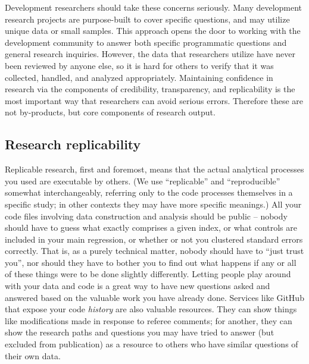 Development researchers should take these concerns seriously.
Many development research projects are purpose-built to cover specific questions,
and may utilize unique data or small samples.
This approach opens the door to working with the development community
to answer both specific programmatic questions and general research inquiries.
However, the data that researchers utilize have never been reviewed by anyone else,
so it is hard for others to verify that it was collected, handled, and analyzed appropriately.
Maintaining confidence in research via the components of credibility, transparency, and replicability
is the most important way that researchers can avoid serious errors. 
Therefore these are not by-products, but core components of research output.

\subsection{Research replicability}

Replicable research, first and foremost,
means that the actual analytical processes you used are executable by others.\cite{dafoe2014science}
(We use ``replicable'' and ``reproducible'' somewhat interchangeably,
referring only to the code processes themselves in a specific study;
in other contexts they may have more specific meanings.)
All your code files involving data construction and analysis
should be public -- nobody should have to guess what exactly comprises a given index,
or what controls are included in your main regression,
or whether or not you clustered standard errors correctly.
That is, as a purely technical matter, nobody should have to ``just trust you'',
nor should they have to bother you to find out what happens
if any or all of these things were to be done slightly differently.\cite{simmons2011false,wicherts2016degrees}
Letting people play around with your data and code is a great way to have new questions asked and answered
based on the valuable work you have already done.
Services like GitHub that expose your code \textit{history}
are also valuable resources. They can show things like modifications
made in response to referee comments; for another, they can show
the research paths and questions you may have tried to answer
(but excluded from publication)
as a resource to others who have similar questions of their own data.

